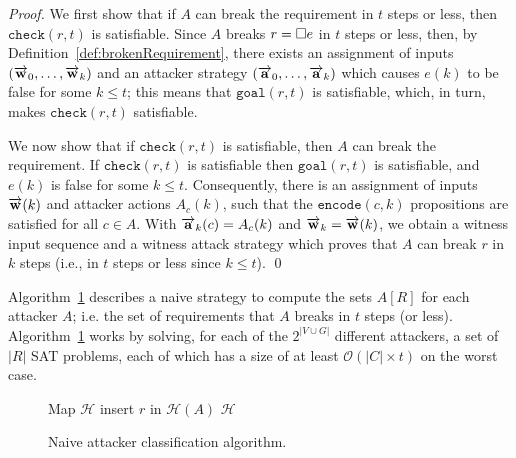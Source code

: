 {\begin{proof}
We first show that if $A$ can break the requirement in $t$ steps or less, then $\mathtt{check}(r,t)$ is satisfiable. Since $A$ breaks $r={{\square}} e$ in $t$ steps or less, then, by Definition~\ref{def:brokenRequirement}, there exists an assignment of inputs $(\overrightarrow{\bf{w}}_0, \ldots, \overrightarrow{\bf{w}}_k)$ and an attacker strategy $(\overrightarrow{\bf{a}}_0, \ldots, \overrightarrow{\bf{a}}_k)$ which causes $e(k)$ to be false for some $k\leq t$; this means that $\mathtt{goal}(r,t)$ is satisfiable, which, in turn, makes $\mathtt{check}(r,t)$ satisfiable.

We now show that if $\mathtt{check}(r,t)$ is satisfiable, then $A$ can break the requirement. If $\mathtt{check}(r,t)$ is satisfiable then $\mathtt{goal}(r,t)$ is satisfiable, and $e(k)$ is false for some $k\leq t$. Consequently, there is an assignment of inputs $\overrightarrow{\bf{w}}(k)$ and attacker actions $A_c(k)$, such that the $\mathtt{encode}(c,k)$ propositions are satisfied for all $c\in A$. With $\overrightarrow{\bf{a}}_k(c)=A_c(k)$ and $\overrightarrow{\bf{w}}_k =\overrightarrow{\bf{w}}(k)$, we obtain a witness input sequence and a witness attack strategy which proves that $A$ can break $r$ in $k$ steps (i.e., in $t$ steps or less since $k\leq t$).
\qed
\end{proof}

Algorithm~\ref{alg:BadQuantification} describes a naive strategy to compute the sets $A[R]$ for each attacker $A$; i.e. the set of requirements that $A$ breaks in $t$ steps (or less). Algorithm~\ref{alg:BadQuantification} works by solving, for each of the $2^{|V \cup G|}$ different attackers, a set of $|R|$ SAT problems, 
{
each of which has a size of at least $\mathcal{O}\left({|C|\times t}\right)$ on the worst case.}

\begin{figure}[!t]
\centering
{
\begin{algorithm}[H]
Map $\mathcal{H}$\;
{
	{
		{
			insert $r$ in $\mathcal{H}(A)$\;
		}
	 }
}
 \Return $\mathcal{H}$\;
 \caption{Naive attacker classification algorithm.}
 \label{alg:BadQuantification}
\end{algorithm}
}
\end{figure}

}
